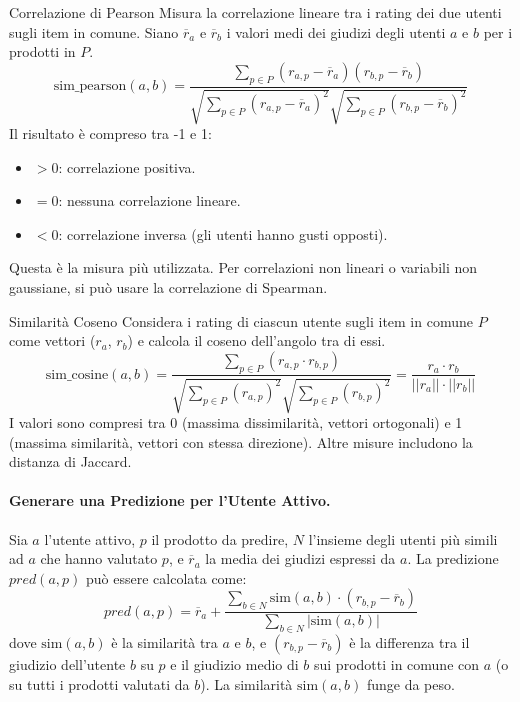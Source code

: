 \documentclass{article}
\begin{document}
\begin{definitionbox}{Correlazione di Pearson}
    Misura la correlazione lineare tra i rating dei due utenti sugli item in comune. Siano $\overline{r}_a$ e $\overline{r}_b$ i valori medi dei giudizi degli utenti $a$ e $b$ per i prodotti in $P$.
    $$ \text{sim\_pearson}(a,b) = \frac{\sum_{p \in P} (r_{a,p} - \overline{r}_a) (r_{b,p} - \overline{r}_b)}{\sqrt{\sum_{p \in P} (r_{a,p} - \overline{r}_a)^2} \sqrt{\sum_{p \in P} (r_{b,p} - \overline{r}_b)^2}} $$
    Il risultato è compreso tra -1 e 1:
    \begin{itemize}
        \item $>0$: correlazione positiva.
        \item $=0$: nessuna correlazione lineare.
        \item $<0$: correlazione inversa (gli utenti hanno gusti opposti).
    \end{itemize}
    Questa è la misura più utilizzata. Per correlazioni non lineari o variabili non gaussiane, si può usare la correlazione di Spearman.
\end{definitionbox}

\begin{definitionbox}{Similarità Coseno}
    Considera i rating di ciascun utente sugli item in comune $P$ come vettori ($r_a$, $r_b$) e calcola il coseno dell'angolo tra di essi.
    $$ \text{sim\_cosine}(a,b) = \frac{\sum_{p \in P} (r_{a,p} \cdot r_{b,p})}{\sqrt{\sum_{p \in P} (r_{a,p})^2} \sqrt{\sum_{p \in P} (r_{b,p})^2}} = \frac{r_a \cdot r_b}{||r_a|| \cdot ||r_b||} $$
    I valori sono compresi tra 0 (massima dissimilarità, vettori ortogonali) e 1 (massima similarità, vettori con stessa direzione). Altre misure includono la distanza di Jaccard.
\end{definitionbox}

\paragraph{Generare una Predizione per l'Utente Attivo.}
Sia $a$ l'utente attivo, $p$ il prodotto da predire, $N$ l'insieme degli utenti più simili ad $a$ che hanno valutato $p$, e $\overline{r}_a$ la media dei giudizi espressi da $a$. La predizione $pred(a,p)$ può essere calcolata come:
$$ pred(a,p) = \overline{r}_a + \frac{\sum_{b \in N} \text{sim}(a,b) \cdot (r_{b,p} - \overline{r}_b)}{\sum_{b \in N} |\text{sim}(a,b)|} $$
dove $\text{sim}(a,b)$ è la similarità tra $a$ e $b$, e $(r_{b,p} - \overline{r}_b)$ è la differenza tra il giudizio dell'utente $b$ su $p$ e il giudizio medio di $b$ sui prodotti in comune con $a$ (o su tutti i prodotti valutati da $b$). La similarità $\text{sim}(a,b)$ funge da peso.
\end{document}
